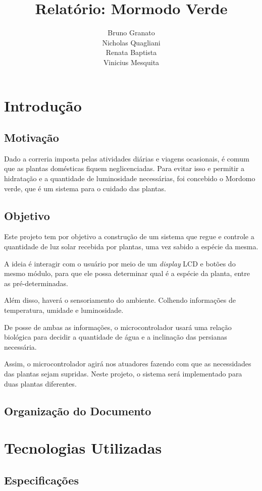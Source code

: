 \documentclass[a4paper,12pt]{report}
\title{ Relatório: Mormodo Verde }
\author{Bruno Granato \\
	Nicholas Quagliani\\
	Renata Baptista\\
	Vinicius Mesquita}
\begin{document}
\maketitle


\tableofcontents
\chapter{Introdução}
	\section{Motivação}
		Dado a correria imposta pelas atividades diárias e viagens ocasionais, é comum que as plantas domésticas fiquem neglicenciadas. Para evitar isso e permitir a hidratação e a quantidade de luminosidade necessárias, foi concebido o Mordomo verde, que é um sistema para o cuidado das plantas.
	\section{Objetivo}
		Este projeto tem por objetivo a construção de um sistema que regue e controle a quantidade de luz solar recebida por plantas, uma vez sabido a espécie da mesma.
		
		A ideia é interagir com o usuário por meio de um \textit{display} LCD e botões do mesmo módulo, para que ele possa determinar qual é a espécie da planta, entre as pré-determinadas. 
		
		Além disso, haverá o sensoriamento do ambiente. Colhendo informações de temperatura, umidade e luminosidade.
		
		De posse de ambas as informações, o microcontrolador usará uma relação biológica para decidir a quantidade de água e a inclinação das persianas necessária. 
		
		Assim, o microcontrolador agirá nos atuadores fazendo com que as necessidades das plantas sejam supridas. Neste projeto, o sistema será implementado para duas plantas diferentes.
	\section{Organização do Documento}

\chapter{Tecnologias Utilizadas}
	\section{Especificações}
	
\end{document}
